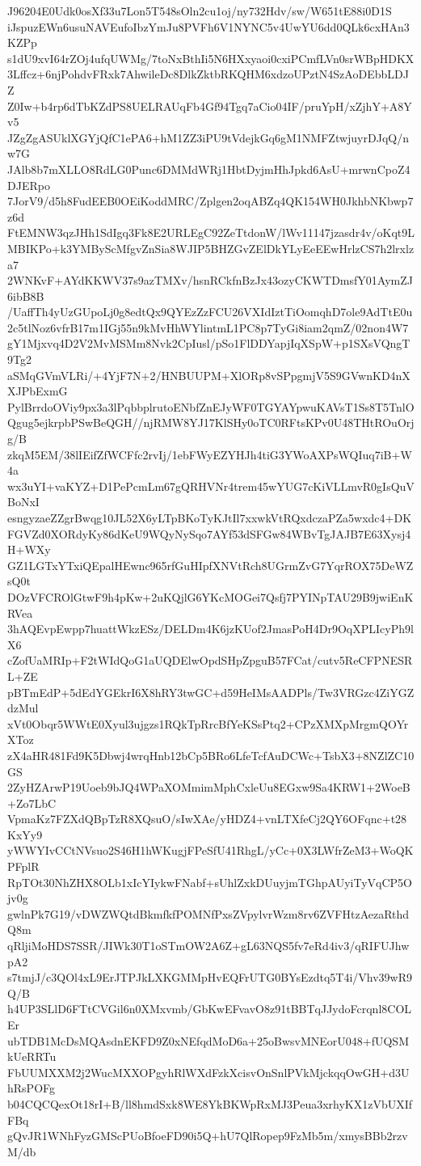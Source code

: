 J96204E0Udk0osXf33u7Lon5T548sOln2cu1oj/ny732Hdv/sw/W651tE88i0D1S
iJspuzEWn6usuNAVEufoIbzYmJu8PVFh6V1NYNC5v4UwYU6dd0QLk6cxHAn3KZPp
s1dU9xvI64rZOj4ufqUWMg/7toNxBthIi5N6HXxyaoi0cxiPCmfLVn0srWBpHDKX
3Lffcz+6njPohdvFRxk7AhwileDc8DlkZktbRKQHM6xdzoUPztN4SzAoDEbbLDJZ
Z0Iw+b4rp6dTbKZdPS8UELRAUqFb4Gf94Tgq7aCio04IF/pruYpH/xZjhY+A8Yv5
JZgZgASUklXGYjQfC1ePA6+hM1ZZ3iPU9tVdejkGq6gM1NMFZtwjuyrDJqQ/nw7G
JAlb8b7mXLLO8RdLG0Punc6DMMdWRj1HbtDyjmHhJpkd6AsU+mrwnCpoZ4DJERpo
7JorV9/d5h8FudEEB0OEiKoddMRC/Zplgen2oqABZq4QK154WH0JkhbNKbwp7z6d
FtEMNW3qzJHh1SdIgq3Fk8E2URLEgC92ZeTtdonW/lWv11147jzasdr4v/oKqt9L
MBIKPo+k3YMByScMfgvZnSia8WJIP5BHZGvZElDkYLyEeEEwHrlzCS7h2lrxlza7
2WNKvF+AYdKKWV37s9azTMXv/hsnRCkfnBzJx43ozyCKWTDmsfY01AymZJ6ibB8B
/UaffTh4yUzGUpoLj0g8edtQx9QYEzZzFCU26VXIdIztTiOomqhD7ole9AdTtE0u
2c5tlNoz6vfrB17m1IGj55n9kMvHhWYlintmL1PC8p7TyGi8iam2qmZ/02non4W7
gY1Mjxvq4D2V2MvMSMm8Nvk2CpIusl/pSo1FlDDYapjIqXSpW+p1SXsVQngT9Tg2
aSMqGVmVLRi/+4YjF7N+2/HNBUUPM+XlORp8vSPpgmjV5S9GVwnKD4nXXJPbExmG
PylBrrdoOViy9px3a3lPqbbplrutoENbfZnEJyWF0TGYAYpwuKAVsT1Ss8T5TnlO
Qgug5ejkrpbPSwBeQGH//njRMW8YJ17KlSHy0oTC0RFtsKPv0U48THtROuOrjg/B
zkqM5EM/38lIEifZfWCFfc2rvIj/1ebFWyEZYHJh4tiG3YWoAXPsWQIuq7iB+W4a
wx3uYI+vaKYZ+D1PePcmLm67gQRHVNr4trem45wYUG7cKiVLLmvR0gIsQuVBoNxI
esngyzaeZZgrBwqg10JL52X6yLTpBKoTyKJtIl7xxwkVtRQxdczaPZa5wxdc4+DK
FGVZd0XORdyKy86dKeU9WQyNySqo7AYf53dSFGw84WBvTgJAJB7E63Xysj4H+WXy
GZ1LGTxYTxiQEpalHEwnc965rfGuHIpfXNVtRch8UGrmZvG7YqrROX75DeWZsQ0t
DOzVFCROlGtwF9h4pKw+2uKQjlG6YKcMOGei7Qsfj7PYINpTAU29B9jwiEnKRVea
3hAQEvpEwpp7huattWkzESz/DELDm4K6jzKUof2JmasPoH4Dr9OqXPLIcyPh9lX6
cZofUaMRIp+F2tWIdQoG1aUQDElwOpdSHpZpguB57FCat/cutv5ReCFPNESRL+ZE
pBTmEdP+5dEdYGEkrI6X8hRY3twGC+d59HeIMsAADPls/Tw3VRGzc4ZiYGZdzMul
xVt0Obqr5WWtE0Xyul3ujgzs1RQkTpRrcBfYeKSsPtq2+CPzXMXpMrgmQOYrXToz
zX4aHR481Fd9K5Dbwj4wrqHnb12bCp5BRo6LfeTcfAuDCWc+TsbX3+8NZlZC10GS
2ZyHZArwP19Uoeb9bJQ4WPaXOMmimMphCxleUu8EGxw9Sa4KRW1+2WoeB+Zo7LbC
VpmaKz7FZXdQBpTzR8XQsuO/sIwXAe/yHDZ4+vnLTXfeCj2QY6OFqnc+t28KxYy9
yWWYIvCCtNVsuo2S46H1hWKugjFPeSfU41RhgL/yCc+0X3LWfrZeM3+WoQKPFplR
RpTOt30NhZHX8OLb1xIcYIykwFNabf+sUhlZxkDUuyjmTGhpAUyiTyVqCP5Ojv0g
gwlnPk7G19/vDWZWQtdBkmfkfPOMNfPxsZVpylvrWzm8rv6ZVFHtzAezaRthdQ8m
qRljiMoHDS7SSR/JIWk30T1oSTmOW2A6Z+gL63NQS5fv7eRd4iv3/qRIFUJhwpA2
s7tmjJ/c3QOl4xL9ErJTPJkLXKGMMpHvEQFrUTG0BYsEzdtq5T4i/Vhv39wR9Q/B
h4UP3SLlD6FTtCVGil6n0XMxvmb/GbKwEFvavO8z91tBBTqJJydoFcrqnl8COLEr
ubTDB1McDsMQAsdnEKFD9Z0xNEfqdMoD6a+25oBwsvMNEorU048+fUQSMkUeRRTu
FbUUMXXM2j2WucMXXOPgyhRlWXdFzkXcisvOnSnlPVkMjckqqOwGH+d3UhRsPOFg
b04CQCQexOt18rI+B/ll8hmdSxk8WE8YkBKWpRxMJ3Peua3xrhyKX1zVbUXIfFBq
gQvJR1WNhFyzGMScPUoBfoeFD90i5Q+hU7QlRopep9FzMb5m/xmysBBb2rzvM/db
